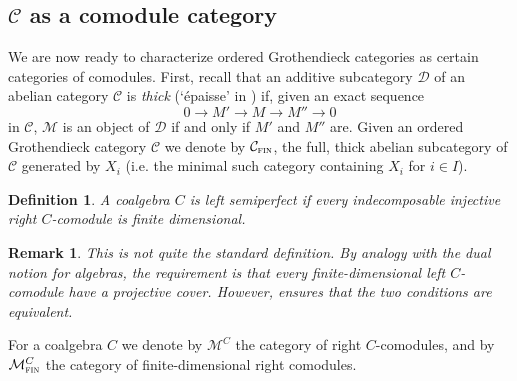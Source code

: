 \documentclass[11pt]{article}
\theoremstyle{plain}
\theoremstyle{nonumberplain}
\theoremstyle{plain}
\newtheorem{definition}[lemma]{Definition}
\newtheorem{remark}[lemma]{Remark}
\theoremstyle{nonumberplain}
\newcommand\cC{{\mathcal C}}
\newcommand\cD{{\mathcal D}}
\newcommand\cM{{\mathcal M}}
\DeclareMathOperator{\fin}{\cat{fin}}
\newcommand{\define}[1]{{\em #1}}
\newcommand{\cat}[1]{\textsc{#1}}
\begin{document}

\subsection{$\cC$ as a comodule category}
\label{subse.comod}



We are now ready to characterize ordered Grothendieck categories as certain categories of comodules. First, recall that an additive subcategory $\cD$ of an abelian category $\cC$ is {\it thick} (`\'epaisse' in \cite[Section III.1]{gab}) if, given an exact sequence
\begin{equation*}
  0\to M'\to M\to M''\to 0
\end{equation*}
in $\cC$, $\cM$ is an object of $\cD$ if and only if $M'$ and $M''$ are. Given an ordered Grothendieck category $\mathcal{C}$ we denote by $\mathcal{C}_{\fin}$, the full, thick abelian subcategory of $\mathcal{C}$ generated by $X_i$ (i.e. the minimal such category containing $X_i$ for $i\in I$). 



\begin{definition}
  A coalgebra $C$ is \define{left semiperfect} if every indecomposable injective \define{right} $C$-comodule is finite dimensional. 
\end{definition}

\begin{remark}
  This is not quite the standard definition. By analogy with the dual notion for algebras, the requirement is that every finite-dimensional \define{left} $C$-comodule have a projective cover. However, \cite[Theorem 10]{Lin77} ensures that the two conditions are equivalent. 
\end{remark}



For a coalgebra $C$ we denote by $\cM^C$ the category of right $C$-comodules, and by $\cM^C_{\fin}$ the category of finite-dimensional right comodules.
\end{document}
